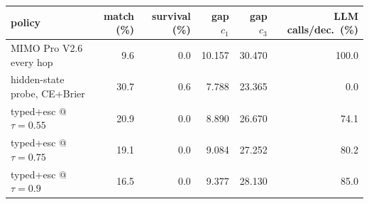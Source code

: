 \begin{tabular}{lrrrrr}\toprule
policy & match (\%) & survival (\%) & gap $c_1$ & gap $c_3$ & LLM calls/dec.\ (\%) \\\midrule
MIMO Pro V2.6 every hop & 9.6 & 0.0 & 10.157 & 30.470 & 100.0 \\
hidden-state probe, CE+Brier & 30.7 & 0.6 & 7.788 & 23.365 & 0.0 \\
typed+esc @ $\tau{=}0.55$ & 20.9 & 0.0 & 8.890 & 26.670 & 74.1 \\
typed+esc @ $\tau{=}0.75$ & 19.1 & 0.0 & 9.084 & 27.252 & 80.2 \\
typed+esc @ $\tau{=}0.9$ & 16.5 & 0.0 & 9.377 & 28.130 & 85.0 \\
\bottomrule\end{tabular}
